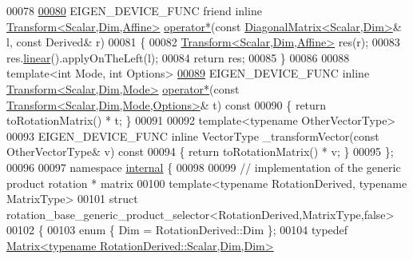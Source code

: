 \begin{DoxyCode}
00078 
\hyperlink{class_eigen_1_1_rotation_base_a507ee9474b9d648cdc9d294f4e944d60}{00080}     EIGEN\_DEVICE\_FUNC \textcolor{keyword}{friend} \textcolor{keyword}{inline} \hyperlink{group___geometry___module_class_eigen_1_1_transform}{Transform<Scalar,Dim,Affine>} 
      \hyperlink{class_eigen_1_1_rotation_base_a507ee9474b9d648cdc9d294f4e944d60}{operator*}(\textcolor{keyword}{const} \hyperlink{group___core___module_class_eigen_1_1_diagonal_matrix}{DiagonalMatrix<Scalar,Dim>}& l, \textcolor{keyword}{const} Derived& r)
00081     \{ 
00082       \hyperlink{group___geometry___module_class_eigen_1_1_transform}{Transform<Scalar,Dim,Affine>} res(r);
00083       res.\hyperlink{group___geometry___module_a535bd63d047c2a36585c3f9b62219a1e}{linear}().applyOnTheLeft(l);
00084       \textcolor{keywordflow}{return} res;
00085     \}
00086 
00088     \textcolor{keyword}{template}<\textcolor{keywordtype}{int} Mode, \textcolor{keywordtype}{int} Options>
\hyperlink{class_eigen_1_1_rotation_base_adf1097a616f0ebf7e78eea9598697672}{00089}     EIGEN\_DEVICE\_FUNC \textcolor{keyword}{inline} \hyperlink{group___geometry___module_class_eigen_1_1_transform}{Transform<Scalar,Dim,Mode>} 
      \hyperlink{class_eigen_1_1_rotation_base_adf1097a616f0ebf7e78eea9598697672}{operator*}(\textcolor{keyword}{const} \hyperlink{group___geometry___module_class_eigen_1_1_transform}{Transform<Scalar,Dim,Mode,Options>}& t)\textcolor{keyword}{ const}
00090 \textcolor{keyword}{    }\{ \textcolor{keywordflow}{return} toRotationMatrix() * t; \}
00091 
00092     \textcolor{keyword}{template}<\textcolor{keyword}{typename} OtherVectorType>
00093     EIGEN\_DEVICE\_FUNC \textcolor{keyword}{inline} VectorType \_transformVector(\textcolor{keyword}{const} OtherVectorType& v)\textcolor{keyword}{ const}
00094 \textcolor{keyword}{    }\{ \textcolor{keywordflow}{return} toRotationMatrix() * v; \}
00095 \};
00096 
00097 \textcolor{keyword}{namespace }\hyperlink{namespaceinternal}{internal} \{
00098 
00099 \textcolor{comment}{// implementation of the generic product rotation * matrix}
00100 \textcolor{keyword}{template}<\textcolor{keyword}{typename} RotationDerived, \textcolor{keyword}{typename} MatrixType>
00101 \textcolor{keyword}{struct }rotation\_base\_generic\_product\_selector<RotationDerived,MatrixType,false>
00102 \{
00103   \textcolor{keyword}{enum} \{ Dim = RotationDerived::Dim \};
00104   \textcolor{keyword}{typedef} \hyperlink{group___core___module_class_eigen_1_1_matrix}{Matrix<typename RotationDerived::Scalar,Dim,Dim>} 

\end{DoxyCode}
